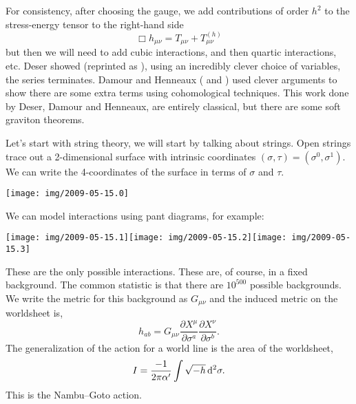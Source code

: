 For consistency, after choosing the gauge, we add contributions of
order $h^{2}$ to the stress-energy tensor to the right-hand side
\begin{equation}
\Box h_{\mu\nu} = T_{\mu\nu} + T^{(h)}_{\mu\nu}
\end{equation}
but then we will need to add cubic interactions, and then quartic
interactions, etc. Deser showed (reprinted as ),
using an incredibly clever choice of variables, the series terminates.
Damour and Henneaux ( and )
used clever arguments to show there are some extra terms using
cohomological techniques. This work done by Deser, Damour and Henneaux,
are entirely classical, but there are some soft graviton theorems.

Let's start with string theory, we will start by talking about strings.
Open strings trace out a 2-dimensional surface with intrinsic
coordinates $(\sigma,\tau)=(\sigma^{0},\sigma^{1})$. We can write the
4-coordinates of the surface in terms of $\sigma$ and $\tau$.
\begin{center}
\texttt{[image: img/2009-05-15.0]}
\end{center}
We can model interactions using pant diagrams, for example:
\begin{center}
\texttt{[image: img/2009-05-15.1]}\texttt{[image: img/2009-05-15.2]}\texttt{[image: img/2009-05-15.3]}
\end{center}
These are the only possible interactions. These are, of course, in a
fixed background. The common statistic is that there are $10^{500}$
possible backgrounds.
We write the metric for this background as $G_{\mu\nu}$ and the induced
metric on the worldsheet is,
\begin{equation}
h_{ab} = G_{\mu\nu}\frac{\partial X^{\mu}}{\partial\sigma^{a}}\frac{\partial X^{\nu}}{\partial\sigma^{b}}.
\end{equation}
The generalization of the action for a world line is the area of the
worldsheet,
\begin{equation}
I = \frac{-1}{2\pi\alpha'}\int\sqrt{-h}\,\mathrm{d}^{2}\sigma.
\end{equation}
This is the Nambu--Goto action.

